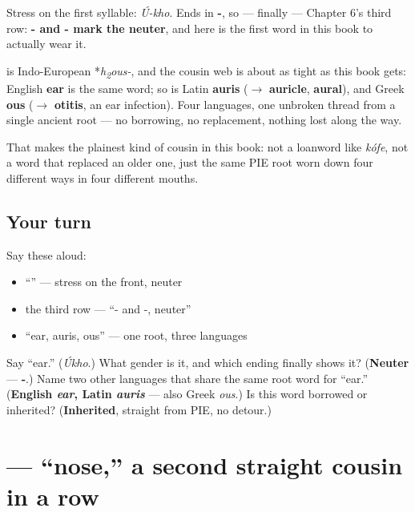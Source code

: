 Stress on the first syllable: \emph{Ú-kho}. Ends in \textbf{-}, so — finally — Chapter 6's third row: \textbf{- and - mark the neuter}, and here is the first word in this book to actually wear it.

\begin{cousinweb}
\textbf{} is Indo-European *\emph{h\textsubscript{2}ous-}, and the cousin web is about as tight as this book gets: English \textbf{ear} is the same word; so is Latin \textbf{auris} ($\to$ \textbf{auricle}, \textbf{aural}), and Greek \textbf{ous} ($\to$ \textbf{otitis}, an ear infection). Four languages, one unbroken thread from a single ancient root — no borrowing, no replacement, nothing lost along the way.

That makes \emph{} the plainest kind of cousin in this book: not a loanword like \emph{kófe}, not a word that replaced an older one, just the same PIE root worn down four different ways in four different mouths.
\end{cousinweb}

\subsection*{Your turn}
Say these aloud:

\begin{itemize}
\raggedright
  \item \textquotedblleft{}\textquotedblright{} — stress on the front, neuter
  \item the third row — \textquotedblleft{}- and -, neuter\textquotedblright{}
  \item \textquotedblleft{}ear, auris, ous\textquotedblright{} — one root, three languages
\end{itemize}

\begin{tcolorbox}[breakable,colback=teal!4,colframe=teal!35!black,title={Before you move on}]
Say \textquotedblleft{}ear.\textquotedblright{} (\emph{Úkho}.) What gender is it, and which ending finally shows it? (\textbf{Neuter} — \textbf{-}.) Name two other languages that share the same root word for \textquotedblleft{}ear.\textquotedblright{} (\textbf{English \emph{ear}, Latin \emph{auris}} — also Greek \emph{ous}.) Is this word borrowed or inherited? (\textbf{Inherited}, straight from PIE, no detour.)
\end{tcolorbox}
\section[\texorpdfstring{\ru{нос} (nos)}{нос (nos)}]{ — \textquotedblleft{}nose,\textquotedblright{} a second straight cousin in a row}

